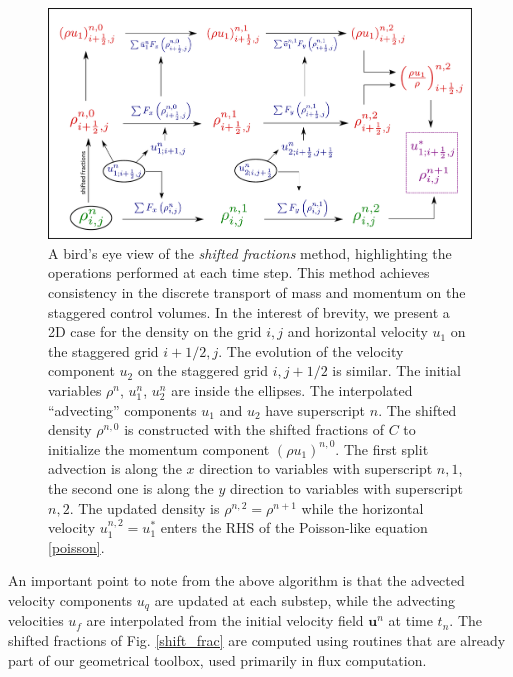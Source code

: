 \begin{figure}
\begin{center}
    \includegraphics[width=\textwidth]{plots/momcons_diagram_daniel.pdf}
\end{center}
\caption{A bird's eye view of the \textit{shifted fractions} method,
highlighting the operations performed at each time step. 
This method achieves consistency in the discrete transport 
of mass and momentum on the staggered control volumes.
In the interest of brevity, we present a 2D case for the
density on the grid $i,j$ and horizontal velocity $u_1$ on the staggered grid $i+1/2,j$.
The evolution of the velocity component $u_2$ on the staggered grid $i,j+1/2$ is similar.
The initial variables $\rho^n$, $u_1^n$, $u_2^n$ are inside the ellipses. The interpolated
``advecting'' components $u_1$ and $u_2$ have superscript $n$. The shifted density $\rho^{n,0}$
is constructed with the shifted fractions of $C$ to initialize the momentum component
$(\rho u_1)^{n,0}$. The first split advection is along the $x$ direction  to 
variables with superscript $n,1$, the second one is along the $y$ direction to
variables with superscript $n,2$. The updated density is $\rho^{n,2}=\rho^{n+1}$
while the horizontal velocity $u_1^{n,2}=u_1^{*}$ enters the RHS of the Poisson-like
equation \ref{poisson}. }
\label{momcons_daniel}
\end{figure}


An important point to note from the above algorithm is that 
the advected velocity components $u_q$ are updated at each substep,
while the advecting velocities $u_f$ are interpolated from the initial
velocity field $\boldsymbol{u}^n$ at time $t_n$. 
The shifted fractions of Fig. \ref{shift_frac}
are computed using routines that are already part of our
geometrical toolbox, used primarily in flux computation. 


